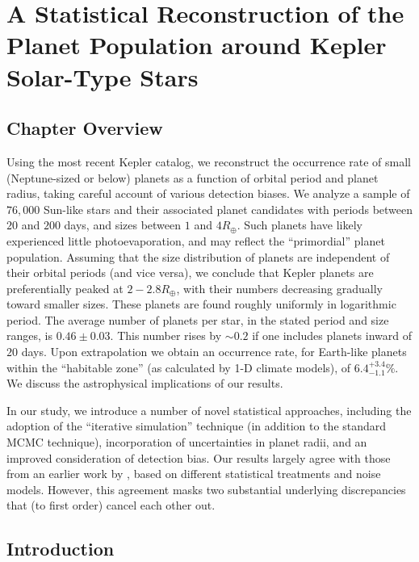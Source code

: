 \chapter[Statistical Reconstruction of Kepler Planets]{A Statistical Reconstruction of the Planet Population around Kepler Solar-Type Stars}
\label{chap:Stats}

\section{Chapter Overview}

  Using the most recent Kepler catalog, we reconstruct the
  occurrence rate of small (Neptune-sized or below) planets as a
  function of orbital period and planet radius, taking careful account
  of various detection biases. We analyze a sample of $76,000$
  Sun-like stars and their associated planet candidates with periods
  between $20$ and $200$ days, and sizes between $1$ and $4
  R_\oplus$. Such planets have likely experienced little
  photoevaporation, and may reflect the ``primordial'' planet
  population. Assuming that the size distribution of planets are
  independent of their orbital periods (and vice versa), we
  conclude that Kepler planets are preferentially peaked at $2-2.8
  R_\oplus$, with their numbers decreasing gradually toward smaller
  sizes. These planets are found roughly uniformly in logarithmic
  period. The average number of planets per star, in the stated period
  and size ranges, is $0.46 \pm 0.03$. This number rises by $\sim
    0.2$ if one includes planets inward of $20$ days.
  Upon extrapolation we obtain an occurrence rate, for
    Earth-like planets within the ``habitable zone'' (as calculated by
  1-D climate models), of $6.4^{+3.4}_{-1.1}\%$. We discuss the
  astrophysical implications of our results.

  In our study, we introduce a number of novel statistical approaches,
  including the adoption of the ``iterative simulation'' technique (in
  addition to the standard MCMC technique), incorporation of
  uncertainties in planet radii, and an improved consideration of
  detection bias. Our results largely agree with those from an earlier
  work by \citet{Petigura2013}, based on different statistical
  treatments and noise models. However, this agreement masks two 
  substantial underlying discrepancies that (to first order) cancel each 
  other out.

\section{Introduction}
\label{sec:introduction}

